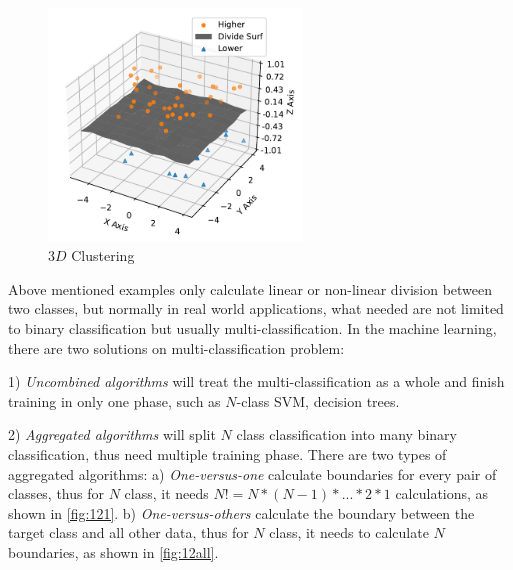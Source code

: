 \begin{spacing}{1.5}
\begin{figure}[ht]
\centering
\includegraphics[width=0.6\textwidth, fbox]{Chapter2/3dcluster.pdf}
\caption{$3D$ Clustering}
\label{fig:3dcluster} 
\end{figure}

Above mentioned examples only calculate linear or non-linear division between two classes, but normally in real world applications, what needed are not limited to binary classification but usually multi-classification. In the machine learning, there are two solutions on multi-classification problem: 

1) \textit{Uncombined algorithms} will treat the multi-classification as a whole and finish training in only one phase, such as $N$-class SVM, decision trees. 

2) \textit{Aggregated algorithms} will split $N$ class classification into many binary classification, thus need multiple training phase. There are two types of aggregated algorithms: a) \textit{One-versus-one} calculate boundaries for every pair of classes, thus for $N$ class, it needs $N!=N*(N-1)*...*2*1$ calculations, as shown in \autoref{fig:121}. b) \textit{One-versus-others} calculate the boundary between the target class and all other data, thus for $N$ class, it needs to calculate $N$ boundaries, as shown in \autoref{fig:12all}. 


\end{spacing}
